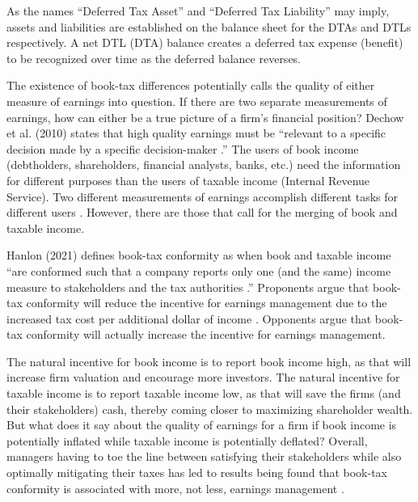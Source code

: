 \documentclass[12pt]{article}
\begin{document}
As the names “Deferred Tax Asset” and “Deferred Tax Liability” may imply, assets and liabilities are established on the balance sheet for the DTAs and DTLs respectively. A net DTL (DTA) balance creates a deferred tax expense (benefit) to be recognized over time as the deferred balance reverses.

The existence of book-tax differences potentially calls the quality of either measure of earnings into question. If there are two separate measurements of earnings, how can either be a true picture of a firm’s financial position? Dechow et al. (2010) states that high quality earnings must be “relevant to a specific decision made by a specific decision-maker \citep{Dechow10}.” The users of book income (debtholders, shareholders, financial analysts, banks, etc.) need the information for different purposes than the users of taxable income (Internal Revenue Service). Two different measurements of earnings accomplish different tasks for different users \citep{Blaylock15}. However, there are those that call for the merging of book and taxable income.

Hanlon (2021) defines book-tax conformity as when book and taxable income “are conformed such that a company reports only one (and the same) income measure to stakeholders and the tax authorities \citep{Hanlon21}.” Proponents argue that book-tax conformity will reduce the incentive for earnings management due to the increased tax cost per additional dollar of income \citep{Blaylock15}. Opponents argue that book-tax conformity will actually increase the incentive for earnings management.

The natural incentive for book income is to report book income high, as that will increase firm valuation and encourage more investors. The natural incentive for taxable income is to report taxable income low, as that will save the firms (and their stakeholders) cash, thereby coming closer to maximizing shareholder wealth. But what does it say about the quality of earnings for a firm if book income is potentially inflated while taxable income is potentially deflated? Overall, managers having to toe the line between satisfying their stakeholders while also optimally mitigating their taxes has led to results being found that book-tax conformity is associated with more, not less, earnings management \citep{Blaylock15} \citep{Hanlon21}. 
\end{document}
